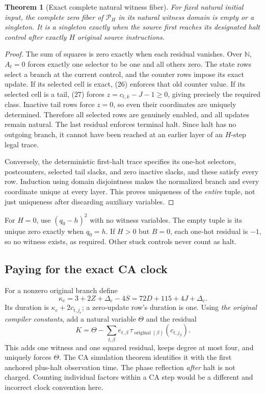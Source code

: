 \documentclass[11pt,a4paper]{article}
\numberwithin{equation}{section}
\newtheorem{theorem}{Theorem}[section]
\newcommand{\N}{\mathbb N}\newcommand{\Z}{\mathbb Z}\newcommand{\R}{\mathbb R}
\begin{document}
\begin{theorem}[Exact complete natural witness fiber]\label{fpa:thm:certificate}
For fixed natural initial input, the complete zero fiber of $\mathcal P_H$ in
its natural witness domain is empty or a singleton. It is a singleton exactly
when the source first reaches its designated halt control after exactly $H$
original source instructions.
\end{theorem}
\begin{proof}
The sum of squares is zero exactly when each residual vanishes. Over $\N$,
$A_t=0$ forces exactly one selector to be one and all others zero. The state
rows select a branch at the current control, and the counter rows impose its
exact update. If its selected cell is exact, (26) enforces that old counter
value. If its selected cell is a tail, (27) forces
$z=c_{t,k}-J-1\ge0$, giving precisely the required class. Inactive tail rows
force $z=0$, so even their coordinates are uniquely determined. Therefore
all selected rows are genuinely enabled, and all updates remain natural.
The last residual enforces terminal halt. Since halt has no outgoing branch,
it cannot have been reached at an earlier layer of an $H$-step legal trace.

Conversely, the deterministic first-halt trace specifies its one-hot
selectors, postcounters, selected tail slacks, and zero inactive slacks, and
these satisfy every row. Induction using domain disjointness makes the
normalized branch and every coordinate unique at every layer. This proves
uniqueness of the \emph{entire} tuple, not just uniqueness after discarding
auxiliary variables.
\end{proof}

For $H=0$, use $(q_0-h)^2$ with no witness variables. The empty tuple is its
unique zero exactly when $q_0=h$. If $H>0$ but $B=0$, each one-hot residual
is $-1$, so no witness exists, as required. Other stuck controls never count
as halt.

\subsection{Paying for the exact CA clock}
For a nonzero original branch define
\[
 \kappa_e=3+2Z+\Delta_e-4S=72D+115+4J+\Delta_e.
\]
Its duration is $\kappa_e+2c_{t,j_e}$; a zero-update row's duration is one.
Using \emph{the original compiler constants}, add a natural variable $\Theta$
and the residual
\[
 K=\Theta-\sum_{t,\beta}e_{t,\beta}\,
               \tau_{\operatorname{original}(\beta)}(c_{t,j_\beta}).\tag{29}
\]
This adds one witness and one squared residual, keeps degree at most four,
and uniquely forces $\Theta$. The CA simulation theorem identifies it with
the first anchored plus-halt observation time. The phase reflection \emph{after}
halt is not charged. Counting individual factors within a CA step would be
a different and incorrect clock convention here.
\end{document}
